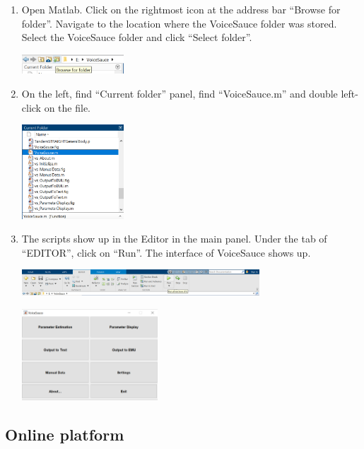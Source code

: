 \documentclass[
]{article}
\providecommand{\tightlist}{%
  \setlength{\itemsep}{0pt}\setlength{\parskip}{0pt}}
\begin{document}
\begin{enumerate}
\def\labelenumi{\arabic{enumi}.}
\setcounter{enumi}{2}
\tightlist
\item
  Open Matlab. Click on the rightmost icon at the address bar ``Browse
  for folder''. Navigate to the location where the VoiceSauce folder was
  stored. Select the VoiceSauce folder and click ``Select folder''.

  \includegraphics[width=0.3\textwidth,height=\textheight]{image/vs_ml_browsefolder.png}
\item
  On the left, find ``Current folder'' panel, find ``VoiceSauce.m'' and
  double left-click on the file.

  \includegraphics[width=0.3\textwidth,height=\textheight]{image/vs_ml_runvs.png}
\item
  The scripts show up in the Editor in the main panel. Under the tab of
  ``EDITOR'', click on ``Run''. The interface of VoiceSauce shows up.

  \includegraphics[width=0.7\textwidth,height=\textheight]{image/vs_run.png}

  \includegraphics[width=0.4\textwidth,height=\textheight]{image/vs_ml_interface.png}
\end{enumerate}

\hypertarget{online-platform}{%
\subsection{Online platform}\label{online-platform}}
\end{document}
